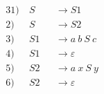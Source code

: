 \begin{alignat*}{3}
1) \ & S &&\rightarrow S1 \\
2) \ & S &&\rightarrow S2 \\
3) \ & S1 &&\rightarrow a\ b\ S\ c \\
4) \ & S1 &&\rightarrow \varepsilon \\
5) \ & S2 &&\rightarrow a\ x\ S\ y \\
6) \ & S2 &&\rightarrow \varepsilon \\
\end{alignat*}